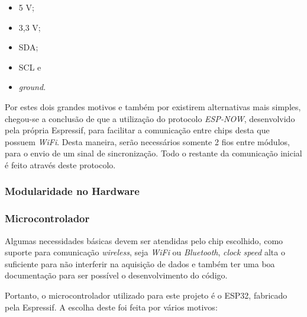 \begin{itemize}
    \item 5 V;
    \item 3,3 V;
    \item SDA;
    \item SCL e
    \item \textit{ground}.
\end{itemize}

Por estes dois grandes motivos e também por existirem alternativas mais simples, chegou-se a conclusão de que a utilização do protocolo \textit{ESP-NOW}, desenvolvido pela própria Espressif, para facilitar a comunicação entre chips desta que possuem \textit{WiFi}. Desta maneira, serão necessários somente 2 fios entre módulos, para o envio de um sinal de sincronização. Todo o restante da comunicação inicial é feito através deste protocolo.

\subsubsection{Modularidade no Hardware}\label{modularidade-metodologia}

\subsubsection{Microcontrolador}\label{uC-metodologia}

Algumas necessidades básicas devem ser atendidas pelo chip escolhido, como suporte para comunicação \textit{wireless}, seja \textit{WiFi} ou \textit{Bluetooth}, \textit{clock speed} alta o suficiente para não interferir na aquisição de dados e também ter uma boa documentação para ser possível o desenvolvimento do código.

Portanto, o microcontrolador utilizado para este projeto é o ESP32, fabricado pela Espressif. A escolha deste foi feita por vários motivos:

